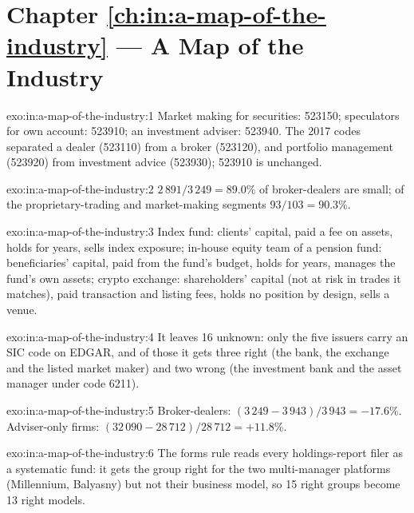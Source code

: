 \section*{Chapter \ref{ch:in:a-map-of-the-industry} --- A Map of the Industry}

\begin{solution}{exo:in:a-map-of-the-industry:1}
Market making for securities: 523150; speculators for own account: 523910; an investment adviser: 523940. The 2017 codes
separated a dealer (523110) from a broker (523120), and portfolio management (523920) from investment advice (523930);
523910 is unchanged.
\end{solution}

\begin{solution}{exo:in:a-map-of-the-industry:2}
$2\,891/3\,249=89.0\%$ of broker-dealers are small; of the proprietary-trading and market-making segments $93/103=90.3\%$.
\end{solution}

\begin{solution}{exo:in:a-map-of-the-industry:3}
Index fund: clients' capital, paid a fee on assets, holds for years, sells index exposure; in-house equity team of a
pension fund: beneficiaries' capital, paid from the fund's budget, holds for years, manages the fund's own assets; crypto
exchange: shareholders' capital (not at risk in trades it matches), paid transaction and listing fees, holds no position
by design, sells a venue.
\end{solution}

\begin{solution}{exo:in:a-map-of-the-industry:4}
It leaves 16 unknown: only the five issuers carry an SIC code on EDGAR, and of those it gets three right (the bank, the
exchange and the listed market maker) and two wrong (the investment bank and the asset manager under code 6211).
\end{solution}

\begin{solution}{exo:in:a-map-of-the-industry:5}
Broker-dealers: $(3\,249-3\,943)/3\,943=-17.6\%$. Adviser-only firms: $(32\,090-28\,712)/28\,712=+11.8\%$.
\end{solution}

\begin{solution}{exo:in:a-map-of-the-industry:6}
The forms rule reads every holdings-report filer as a systematic fund: it gets the group right for the two multi-manager
platforms (Millennium, Balyasny) but not their business model, so 15 right groups become 13 right models.
\end{solution}

